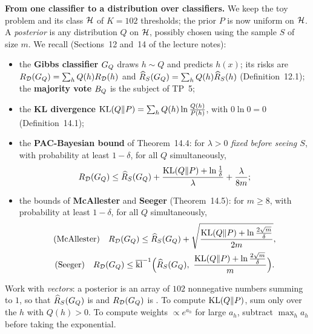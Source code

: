 \documentclass[a4paper,11pt]{article}
\begin{document}
\medskip
\noindent\textbf{From one classifier to a distribution over classifiers.} We keep the toy problem and its class $\mathcal{H}$ of
$K=102$ thresholds; the prior $P$ is now uniform on $\mathcal{H}$. A \emph{posterior} is any distribution $Q$ on $\mathcal{H}$,
possibly chosen using the sample $S$ of size $m$. We recall (Sections~12 and~14 of the lecture notes):
\begin{itemize}
\item the \textbf{Gibbs classifier} $G_{Q}$ draws $h\sim Q$ and predicts $h(x)$; its risks are $R_{\mathcal{D}}(G_{Q})=\sum_hQ(h)R_{\mathcal{D}}(h)$ and
      $\widehat{R}_{S}(G_{Q})=\sum_hQ(h)\widehat{R}_{S}(h)$ (Definition~12.1); the \textbf{majority vote} $B_{Q}$ is the subject of TP~5;
\item the \textbf{KL divergence} $\operatorname{KL}(Q\|P)=\sum_hQ(h)\ln\frac{Q(h)}{P(h)}$, with $0\ln0=0$ (Definition~14.1);
\item the \textbf{PAC-Bayesian bound} of Theorem~14.4: for $\lambda>0$ \emph{fixed before seeing $S$}, with probability at
      least $1-\delta$, for all $Q$ simultaneously,
      \[
      R_{\mathcal{D}}(G_{Q})\leq\widehat{R}_{S}(G_{Q})+\frac{\operatorname{KL}(Q\|P)+\ln\frac1\delta}{\lambda}+\frac{\lambda}{8m};
      \]
\item the bounds of \textbf{McAllester} and \textbf{Seeger} (Theorem~14.5): for $m\geq8$, with probability at least
      $1-\delta$, for all $Q$ simultaneously,
      \begin{gather*}
      \text{(McAllester)}\quad\RD(\GQ)\leq\RS(\GQ)+\sqrt{\frac{\KL(Q\|P)+\ln\frac{2\sqrt m}{\delta}}{2m}},\\
      \text{(Seeger)}\quad\RD(\GQ)\leq\klup\Big(\RS(\GQ),\ \frac{\KL(Q\|P)+\ln\frac{2\sqrt m}{\delta}}{m}\Big).
      \end{gather*}
\end{itemize}

\begin{tip}
Work with \emph{vectors}: a posterior is an array of $102$ nonnegative numbers summing to $1$, so that
$\widehat{R}_{S}(G_{Q})$ is  and $R_{\mathcal{D}}(G_{Q})$ is . To compute $\operatorname{KL}(Q\|P)$, sum only over the $h$ with $Q(h)>0$.
To compute weights $\propto e^{a_h}$ for large $a_h$, subtract $\max_ha_h$ before taking the exponential.
\end{tip}

\label{p4:post}
\end{document}
